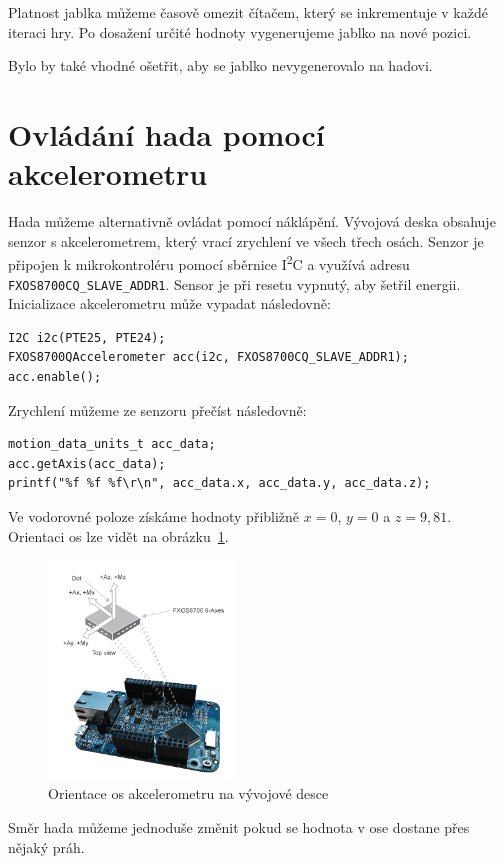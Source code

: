 \documentclass[12pt]{article}
\newcommand{\twi}{I\textsuperscript{2}C}
\begin{document}
Platnost jablka můžeme časově omezit čítačem, který se inkrementuje v každé iteraci hry.
Po dosažení určité hodnoty vygenerujeme jablko na nové pozici.

Bylo by také vhodné ošetřit, aby se jablko nevygenerovalo na hadovi.

\section{Ovládání hada pomocí akcelerometru}
Hada můžeme alternativně ovládat pomocí náklápění.
Vývojová deska obsahuje senzor s akcelerometrem, který vrací zrychlení ve všech třech osách.
Senzor je připojen k mikrokontroléru pomocí sběrnice \twi{} a využívá adresu \texttt{FXOS8700CQ\_SLAVE\_ADDR1}.
Sensor je při resetu vypnutý, aby šetřil energii.
Inicializace akcelerometru může vypadat následovně:
\begin{verbatim}
I2C i2c(PTE25, PTE24);
FXOS8700QAccelerometer acc(i2c, FXOS8700CQ_SLAVE_ADDR1);
acc.enable();
\end{verbatim}

Zrychlení můžeme ze senzoru přečíst následovně:
\begin{verbatim}
motion_data_units_t acc_data;
acc.getAxis(acc_data);
printf("%f %f %f\r\n", acc_data.x, acc_data.y, acc_data.z);
\end{verbatim}
Ve vodorovné poloze získáme hodnoty přibližně $ x = 0$, $y = 0$ a $z = 9,81 $.
Orientaci os lze vidět na obrázku~\ref{fig:axes}.

\begin{figure}[ht]
  \centering
  \includegraphics[width=5cm]{figures/axis}
  \caption[]{Orientace os akcelerometru na vývojové desce\footnotemark}
  \label{fig:axes}
\end{figure}

Směr hada můžeme jednoduše změnit pokud se hodnota v ose dostane přes nějaký práh.
\end{document}
